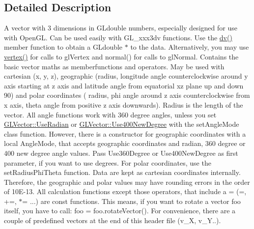 \subsection{\-Detailed \-Description}
\-A vector with 3 dimensions in \-G\-Ldouble numbers, especially designed for use with \-Open\-G\-L. \-Can be used easily with \-G\-L\-\_\-xxx3dv functions. \-Use the \hyperlink{classGLVector_a3408513f72b99c63c81702f2e2ccba96}{dv()} member function to obtain a \-G\-Ldouble $\ast$ to the data. \-Alternatively, you may use \hyperlink{classGLVector_a050ef5239fb7a6d83ef5158c955fa006}{vertex()} for calls to gl\-Vertex and normal() for calls to gl\-Normal. \-Contains the basic vector maths as memberfunctions and operators. \-May be used with cartesian (x, y, z), geographic (radius, longitude angle counterclockwise around y axis starting at z axis and latitude angle from equatorial xz plane up and down 90) and polar coordinates ( radius, phi angle around z axis counterclockwise from x axis, theta angle from positive z axis downwards). \-Radius is the length of the vector. \-All angle functions work with 360 degree angles, unless you set \hyperlink{classGLVector_a8b1fc370c56a13540109b9b6f3d4f5df}{\-G\-L\-Vector\-::\-Use\-Radian} or \hyperlink{classGLVector_a4ee1d6d06257b4e5399ad196eb6db536}{\-G\-L\-Vector\-::\-Use400\-New\-Degree} with the set\-Angle\-Mode class function. \-However, there is a constructor for geographic coordinates with a local \-Angle\-Mode, that accepts geographic coordinates and radian, 360 degree or 400 new degree angle values. \-Pass \-Use360\-Degree or \-Use400\-New\-Degree as first parameter, if you want to use degrees. \-For polar coordinates, use the set\-Radius\-Phi\-Theta function. \-Data are kept as cartesian coordinates internally. \-Therefore, the geographic and polar values may have rounding errors in the order of 10\-E-\/13. \-All calculation functions except those operators, that include a = (=, +=, $\ast$= ...) are const functions. \-This means, if you want to rotate a vector foo itself, you have to call\-: foo = foo.\-rotate\-Vector(). \-For convenience, there are a couple of predefined vectors at the end of this header file (v\-\_\-\-X, v\-\_\-\-Y..).

